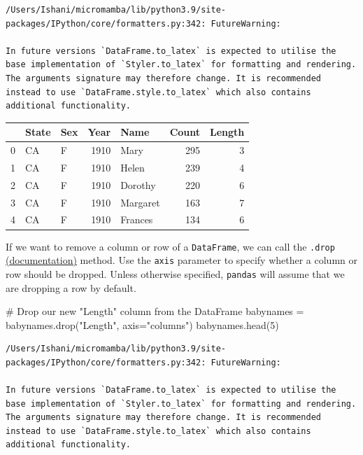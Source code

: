 \documentclass[
  letterpaper,
  DIV=11,
  numbers=noendperiod]{scrreprt}
\newenvironment{Shaded}{\begin{snugshade}}{\end{snugshade}}
\newcommand{\CommentTok}[1]{\textcolor[rgb]{0.37,0.37,0.37}{#1}}
\newcommand{\DecValTok}[1]{\textcolor[rgb]{0.68,0.00,0.00}{#1}}
\newcommand{\NormalTok}[1]{\textcolor[rgb]{0.00,0.23,0.31}{#1}}
\newcommand{\OperatorTok}[1]{\textcolor[rgb]{0.37,0.37,0.37}{#1}}
\newcommand{\StringTok}[1]{\textcolor[rgb]{0.13,0.47,0.30}{#1}}
\begin{document}
\begin{verbatim}
/Users/Ishani/micromamba/lib/python3.9/site-packages/IPython/core/formatters.py:342: FutureWarning:

In future versions `DataFrame.to_latex` is expected to utilise the base implementation of `Styler.to_latex` for formatting and rendering. The arguments signature may therefore change. It is recommended instead to use `DataFrame.style.to_latex` which also contains additional functionality.
\end{verbatim}

\begin{tabular}{lllrlrr}
\toprule
{} & State & Sex &  Year &      Name &  Count &  Length \\
\midrule
0 &    CA &   F &  1910 &      Mary &    295 &       3 \\
1 &    CA &   F &  1910 &     Helen &    239 &       4 \\
2 &    CA &   F &  1910 &   Dorothy &    220 &       6 \\
3 &    CA &   F &  1910 &  Margaret &    163 &       7 \\
4 &    CA &   F &  1910 &   Frances &    134 &       6 \\
\bottomrule
\end{tabular}

If we want to remove a column or row of a \texttt{DataFrame}, we can
call the \texttt{.drop}
\href{https://pandas.pydata.org/pandas-docs/stable/reference/api/pandas.DataFrame.drop.html}{(documentation)}
method. Use the \texttt{axis} parameter to specify whether a column or
row should be dropped. Unless otherwise specified, \texttt{pandas} will
assume that we are dropping a row by default.

\begin{Shaded}
\begin{Highlighting}[]
\CommentTok{\# Drop our new "Length" column from the DataFrame}
\NormalTok{babynames }\OperatorTok{=}\NormalTok{ babynames.drop(}\StringTok{"Length"}\NormalTok{, axis}\OperatorTok{=}\StringTok{"columns"}\NormalTok{)}
\NormalTok{babynames.head(}\DecValTok{5}\NormalTok{)}
\end{Highlighting}
\end{Shaded}

\begin{verbatim}
/Users/Ishani/micromamba/lib/python3.9/site-packages/IPython/core/formatters.py:342: FutureWarning:

In future versions `DataFrame.to_latex` is expected to utilise the base implementation of `Styler.to_latex` for formatting and rendering. The arguments signature may therefore change. It is recommended instead to use `DataFrame.style.to_latex` which also contains additional functionality.
\end{verbatim}
\end{document}
